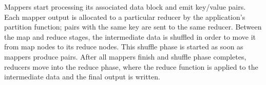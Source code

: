 Mappers start processing its associated data block and emit key/value pairs. Each mapper output is allocated to a particular reducer by the application's partition function; pairs with the same key are sent to the same reducer. Between the map and reduce stages, the intermediate data is shuffled in order to move it from map nodes to its reduce nodes. This shuffle phase is started as soon as mappers produce pairs. After all mappers finish and shuffle phase completes, reducers move into the reduce phase, where the reduce function is applied to the intermediate data and the final output is written.
\par






